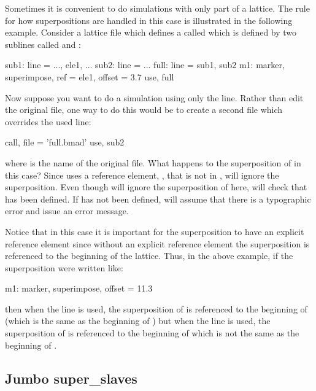 Sometimes it is convenient to do simulations with only part of a lattice. The rule for how
superpositions are handled in this case is illustrated in the following example. Consider
a lattice file which defines a  called  which is defined by two sublines called
 and :
\begin{example}
  sub1: line = {..., ele1, ...}
  sub2: line = {...}
  full: line = {sub1, sub2}
  m1: marker, superimpose, ref = ele1, offset = 3.7
  use, full
\end{example}
Now suppose you want to do a simulation using only the  line. Rather than edit the
original file, one way to do this would be to create a second file which
overrides the used line:
\begin{example}
  call, file = 'full.bmad'
  use, sub2
\end{example}
where  is the name of the original file. What happens to the superposition
of  in this case? Since  uses a reference element, , that is not in
, \bmad will ignore the superposition. Even though \bmad will ignore the superposition
of  here, \bmad will check that  has been defined. If  has not been
defined, \bmad will assume that there is a typographic error and issue an error message. 

Notice that in this case it is important for the superposition to have an explicit
reference element since without an explicit reference element the superposition is
referenced to the beginning of the lattice. Thus, in the above example, if the
superposition were written like:
\begin{example}
  m1: marker, superimpose, offset = 11.3
\end{example}
then when the  line is used, the superposition of  is referenced to the
beginning of  (which is the same as the beginning of ) but when the
 line is used, the superposition of  is referenced to the beginning
of  which is not the same as the beginning of .

\subsection{Jumbo super_slaves}
\label{s:jumbo.slave}

